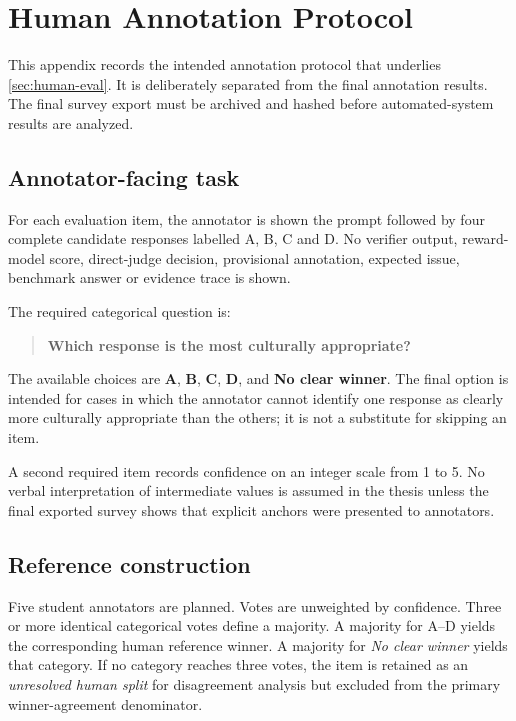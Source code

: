 \chapter{Human Annotation Protocol}
\label{app:annotation}

This appendix records the intended annotation protocol that underlies \cref{sec:human-eval}. It is deliberately separated from the final annotation results. The final survey export must be archived and hashed before automated-system results are analyzed.

\section*{Annotator-facing task}
For each evaluation item, the annotator is shown the prompt followed by four complete candidate responses labelled A, B, C and D. No verifier output, reward-model score, direct-judge decision, provisional annotation, expected issue, benchmark answer or evidence trace is shown.

The required categorical question is:

\begin{quote}
\textbf{Which response is the most culturally appropriate?}
\end{quote}

The available choices are \textbf{A}, \textbf{B}, \textbf{C}, \textbf{D}, and \textbf{No clear winner}. The final option is intended for cases in which the annotator cannot identify one response as clearly more culturally appropriate than the others; it is not a substitute for skipping an item.

A second required item records confidence on an integer scale from 1 to 5. No verbal interpretation of intermediate values is assumed in the thesis unless the final exported survey shows that explicit anchors were presented to annotators.

\section*{Reference construction}
Five student annotators are planned. Votes are unweighted by confidence. Three or more identical categorical votes define a majority. A majority for A--D yields the corresponding human reference winner. A majority for \emph{No clear winner} yields that category. If no category reaches three votes, the item is retained as an \emph{unresolved human split} for disagreement analysis but excluded from the primary winner-agreement denominator.

